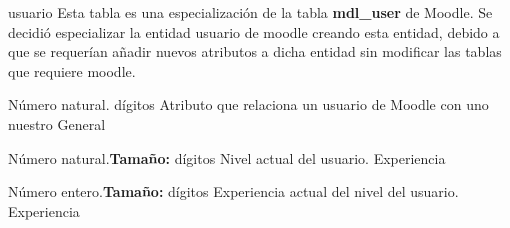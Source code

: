     \begin{Entidad}{usuario}{%
    Esta tabla es una especialización de la tabla {\bf mdl\_user} de Moodle. Se decidió especializar la entidad usuario de moodle creando esta entidad, debido a que se requerían añadir nuevos atributos a dicha entidad sin modificar las tablas que requiere moodle.}
            
            {Número \newline natural.  dígitos}
            {Atributo que relaciona un usuario de Moodle con uno nuestro}
                {%
                }
            {General}
            
            {Número \newline natural.\newline \textbf{Tamaño:} dígitos}
            {Nivel actual del usuario.}
                {
                }
            {Experiencia}
            
            {Número \newline entero.\newline \textbf{Tamaño:} dígitos }
            {Experiencia actual del nivel del usuario.}
                {
                }
            {Experiencia}
            
    \end{Entidad}
    



    
